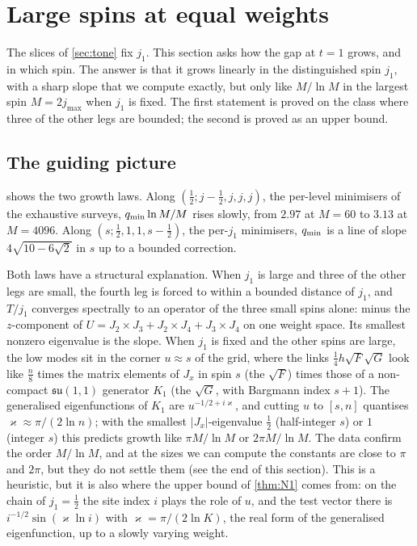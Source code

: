 \section{Large spins at equal weights}\label{sec:large}

The slices of \cref{sec:tone} fix $j_1$. This section asks how the gap at $t=1$ grows,
and in which spin. The answer is that it grows linearly in the distinguished spin
$j_1$, with a sharp slope that we compute exactly, but only like $M/\ln M$ in the
largest spin $M=2j_{\max}$ when $j_1$ is fixed. The first statement is proved on the
class where three of the other legs are bounded; the second is proved as an upper bound.

\subsection{The guiding picture}

 shows the two growth laws. Along $(\frac12;j-\frac12,j,j,j)$, the
per-level minimisers of the exhaustive surveys, $q_{\min}\ln M/M$ rises slowly, from $2.97$ at
$M=60$ to $3.13$ at $M=4096$.
Along $(s;\frac12,1,1,s-\frac12)$, the per-$j_1$ minimisers, $q_{\min}$ is a line of slope
$4\sqrt{10-6\sqrt2}$ in $s$ up to a bounded correction.

Both laws have a structural explanation. When $j_1$ is large and three of the other
legs are small, the fourth leg is forced to within a bounded distance of $j_1$, and
$T/j_1$ converges spectrally to an operator of the three small spins alone: minus the
$z$-component of $U=J_2\times J_3+J_2\times J_4+J_3\times J_4$ on one weight space. Its smallest
nonzero eigenvalue is the slope. When $j_1$ is fixed and the other spins are large,
the low modes sit in the corner $u\approx s$ of the grid, where the links
$\frac14h\sqrt{F}\sqrt G$ look like $\frac n8$ times the matrix elements of $J_x$ in
spin $s$ (the $\sqrt F$) times those of a non-compact $\mathfrak{su}(1,1)$ generator
$K_1$ (the $\sqrt{G}$, with Bargmann index $s+1$). The generalised eigenfunctions of
$K_1$ are $u^{-1/2+i\varkappa}$, and cutting $u$ to $[s,n]$ quantises
$\varkappa\approx\pi/(2\ln n)$; with the smallest $|J_x|$-eigenvalue $\frac12$ (half-integer
$s$) or $1$ (integer $s$) this predicts growth like $\pi M/\ln M$ or $2\pi M/\ln M$. The
data confirm the order $M/\ln M$, and at the sizes we can compute the constants are close
to $\pi$ and $2\pi$, but they do not settle them (see the end of this section). This is
a heuristic, but it is also where the upper bound of
\cref{thm:N1} comes from: on the chain of $j_1=\frac12$ the site index $i$ plays the role
of $u$, and the test vector there is $i^{-1/2}\sin(\varkappa\ln i)$ with
$\varkappa=\pi/(2\ln K)$, the real form of the generalised eigenfunction, up to a
slowly varying weight.

